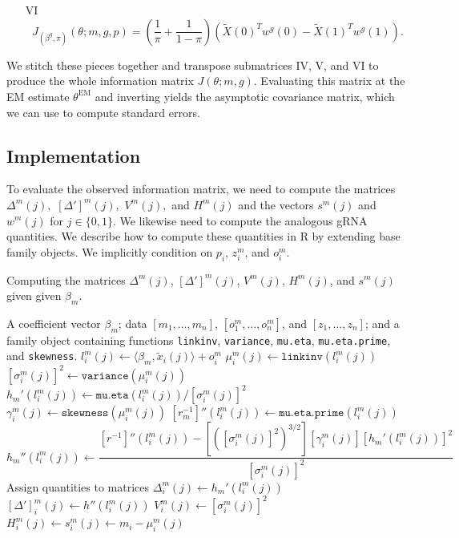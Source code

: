 \documentclass[12pt]{article}
\begin{document}
\begin{appendices}
\begin{refsection}
\begin{itemize}
			\item[VI] $$ J_{(\beta^g, \pi)}(\theta; m, g, p) = \left(\frac{1}{\pi} + \frac{1}{1 - \pi} \right) \left( \tilde{X}(0)^T w^g(0) - \tilde{X}(1)^T w^g(1)\right).$$
		\end{itemize}
		We stitch these pieces together and transpose submatrices IV, V, and VI to produce the whole information matrix $J(\theta; m, g)$. Evaluating this matrix at the EM estimate $\theta^\textrm{EM}$ and inverting yields the asymptotic covariance matrix, which we can use to compute standard errors.
		
		\subsection{Implementation}
		To evaluate the observed information matrix, we need to compute the matrices $\Delta^m(j),$ $[\Delta']^m(j),$ $V^m(j),$ and $H^m(j)$ and the vectors $s^m(j)$ and $w^m(j)$ for $j \in \{0,1\}$. We likewise need to compute the analogous gRNA quantities. We describe how to compute these quantities in R by extending base family objects. We implicitly condition on $p_i$, $z^m_i$, and $o^m_i$.
		
		\begin{algorithm}
			\caption{Computing the matrices $\Delta^m(j)$, $[\Delta']^m(j)$, $V^m(j)$, $H^m(j)$, and $s^m(j)$ given given $\beta_m$.}\label{algo:computing_info_matrices}
			\begin{algorithmic}[3]
				\Require A coefficient vector $\beta_m$; data $[m_1, \dots, m_n]$, $[o^m_1, \dots, o^m_n]$, and $[z_1, \dots, z_n]$; and a family object containing functions \texttt{linkinv}, \texttt{variance}, \texttt{mu.eta}, \texttt{mu.eta.prime}, and \texttt{skewness}.
				\State $l^m_i(j) \gets \langle \beta_m, \tilde{x}_i(j) \rangle + o^m_i$
				\State $\mu^m_i(j) \gets \texttt{linkinv}(l^m_i(j))$
				\State $[\sigma_i^m(j)]^2 \gets \texttt{variance}(\mu_i^m(j))$
				\State $h_m'(l_i^m(j)) \gets \texttt{mu.eta}(l_i^m(j))/[\sigma_i^m(j)]^2$
				\State $\gamma^m_i(j) \gets \texttt{skewness}(\mu^m_i(j))$
				\State $[r_m^{-1}]''(l_i^m(j)) \gets \texttt{mu.eta.prime}(l^m_i(j))$
				\State $$h_m''(l_i^m(j)) \gets \frac{[r^{-1}]''(l_i^m(j)) - [([\sigma_i^m(j)]^2)^{3/2}][\gamma^m_i(j)] [h_m'(l_i^m(j))]^2}{[\sigma_i^m(j)]^2}$$
				\Comment Assign quantities to matrices
				\State $\Delta_{i}^m(j) \gets h_m'( l_i^m(j))$
				\State $[\Delta']^m_{i}(j) \gets h''(l^m_i(j))$
				\State $V^m_{i}(j) \gets [\sigma^m_i(j)]^2$
				\State $H^m_{i}(j) \gets s^m_i(j) \gets m_i - \mu^m_i(j)$
				\EndFor
				\EndFor
			\end{algorithmic}
		\end{algorithm}
		

\end{refsection}
\end{appendices}
\end{document}
